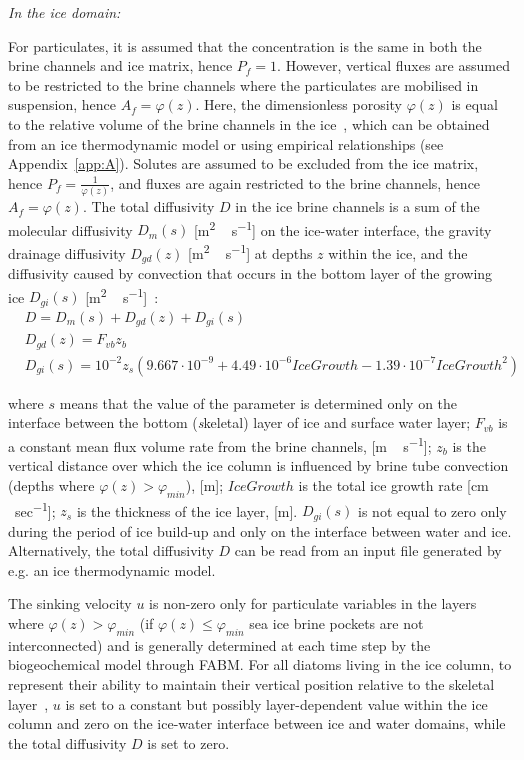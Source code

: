 \documentclass[gmd, manuscript]{copernicus}
\begin{document}
\emph{In the ice domain:}

For particulates, it is assumed that the concentration is the same in both the brine channels and ice matrix, hence $P_{f} = 1$.
However, vertical fluxes are assumed to be restricted to the brine channels where the particulates are mobilised in suspension, hence $A_{f} = \varphi(z)$.
Here, the dimensionless porosity $\varphi(z)$ is equal to the relative volume of the brine channels in the ice~\citep{Arrigo1993}, which can be obtained from an ice thermodynamic model or using empirical relationships (see Appendix~\ref{app:A}).
Solutes are assumed to be excluded from the ice matrix, hence $P_{f} = \frac{1}{\varphi(z)}$, and fluxes are again restricted to the brine channels, hence $A_{f} = \varphi(z)$.
The total diffusivity $D$ in the ice brine channels is a sum of the molecular diffusivity $D_{m}(s)$ [\unit{m^{2}\,s^{-1}}] on the ice-water interface, the gravity drainage diffusivity $D_{gd}(z)$ [\unit{m^{2}\,s^{-1}}] at depths $z$ within the ice, and the diffusivity caused by convection that occurs in the bottom layer of the growing ice $D_{gi}(s)$ [\unit{m^{2}\,s^{-1}}]~\citep{Arrigo1993}:
\begin{align}
    &D = D_{m}(s) + D_{gd}(z) + D_{gi}(s)\\
    &D_{gd}(z) = F_{vb} z_{b}\\
    &D_{gi}(s) = 10^{-2} z_{s} (9.667 \cdot 10^{-9}
    + 4.49 \cdot 10^{-6}IceGrowth
    - 1.39 \cdot 10^{-7}IceGrowth^{2})
\end{align}

where $s$ means that the value of the parameter is determined only on the interface between the bottom (\textit{s}\/keletal) layer of ice and surface water layer;
$F_{vb}$ is a constant mean flux volume rate from the brine channels, [\unit{m\,s^{-1}}];
$z_{b}$ is the vertical distance over which the ice column is influenced by brine tube convection (depths where $\varphi(z) > \varphi_{min}$), [\unit{m}];
$IceGrowth$ is the total ice growth rate [\unit{cm\,sec^{-1}}];
$z_{s}$ is the thickness of the ice layer, [\unit{m}].
$D_{gi}(s)$ is not equal to zero only during the period of ice build-up and only on the interface between water and ice.
Alternatively, the total diffusivity $D$ can be read from an input file generated by e.g. an ice thermodynamic model.

The sinking velocity $u$ is non-zero only for particulate variables in the layers where $\varphi(z) > \varphi_{min}$ (if $\varphi(z) \leqslant \varphi_{min}$ sea ice brine pockets are not interconnected) and is generally determined at each time step by the biogeochemical model through \textrm{FABM}.
For all diatoms living in the ice column, to represent their ability to maintain their vertical position relative to the skeletal layer~\citep{Arrigo1993}, $u$ is set to a constant but possibly layer-dependent value within the ice column and zero on the ice-water interface between ice and water domains, while the total diffusivity $D$ is set to zero.
\end{document}
